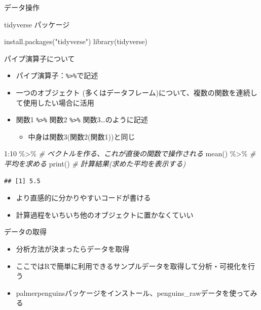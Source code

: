 \documentclass[
  ignorenonframetext,
]{beamer}
\newenvironment{Shaded}{\begin{snugshade}}{\end{snugshade}}
\newcommand{\CommentTok}[1]{\textcolor[rgb]{0.56,0.35,0.01}{\textit{#1}}}
\newcommand{\DecValTok}[1]{\textcolor[rgb]{0.00,0.00,0.81}{#1}}
\newcommand{\FunctionTok}[1]{\textcolor[rgb]{0.00,0.00,0.00}{#1}}
\newcommand{\NormalTok}[1]{#1}
\newcommand{\SpecialCharTok}[1]{\textcolor[rgb]{0.00,0.00,0.00}{#1}}
\newcommand{\StringTok}[1]{\textcolor[rgb]{0.31,0.60,0.02}{#1}}
\providecommand{\tightlist}{%
  \setlength{\itemsep}{0pt}\setlength{\parskip}{0pt}}
\begin{document}
\begin{frame}[fragile]{データ操作}
\begin{block}{tidyverse パッケージ}
\begin{Shaded}
\begin{Highlighting}[]
\FunctionTok{install.packages}\NormalTok{(}\StringTok{"tidyverse"}\NormalTok{)}
\FunctionTok{library}\NormalTok{(tidyverse)}
\end{Highlighting}
\end{Shaded}
\end{block}

\begin{block}{パイプ演算子について}
\protect\hypertarget{ux30d1ux30a4ux30d7ux6f14ux7b97ux5b50ux306bux3064ux3044ux3066}{}
\begin{itemize}
\tightlist
\item
  パイプ演算子：\texttt{\%\textgreater{}\%}で記述
\item
  一つのオブジェクト
  (多くはデータフレーム)について、複数の関数を連続して使用したい場合に活用
\item
  関数1 \texttt{\%\textgreater{}\%} 関数2 \texttt{\%\textgreater{}\%}
  関数3\ldots のように記述

  \begin{itemize}
  \tightlist
  \item
    中身は関数3(関数2(関数1))と同じ
  \end{itemize}
\end{itemize}

\begin{Shaded}
\begin{Highlighting}[]
\DecValTok{1}\SpecialCharTok{:}\DecValTok{10} \SpecialCharTok{\%\textgreater{}\%} \CommentTok{\# ベクトルを作る、これが直後の関数で操作される}
  \FunctionTok{mean}\NormalTok{() }\SpecialCharTok{\%\textgreater{}\%} \CommentTok{\# 平均を求める}
  \FunctionTok{print}\NormalTok{() }\CommentTok{\# 計算結果(求めた平均を表示する)}
\end{Highlighting}
\end{Shaded}

\begin{verbatim}
## [1] 5.5
\end{verbatim}

\begin{itemize}
\tightlist
\item
  より直感的に分かりやすいコードが書ける
\item
  計算過程をいちいち他のオブジェクトに置かなくていい
\end{itemize}
\end{block}

\begin{block}{データの取得}
\protect\hypertarget{ux30c7ux30fcux30bfux306eux53d6ux5f97}{}
\begin{itemize}
\tightlist
\item
  分析方法が決まったらデータを取得
\item
  ここではRで簡単に利用できるサンプルデータを取得して分析・可視化を行う
\item
  palmerpenguinsパッケージをインストール、penguins\_rawデータを使ってみる
\end{itemize}


\end{block}
\end{frame}
\end{document}
